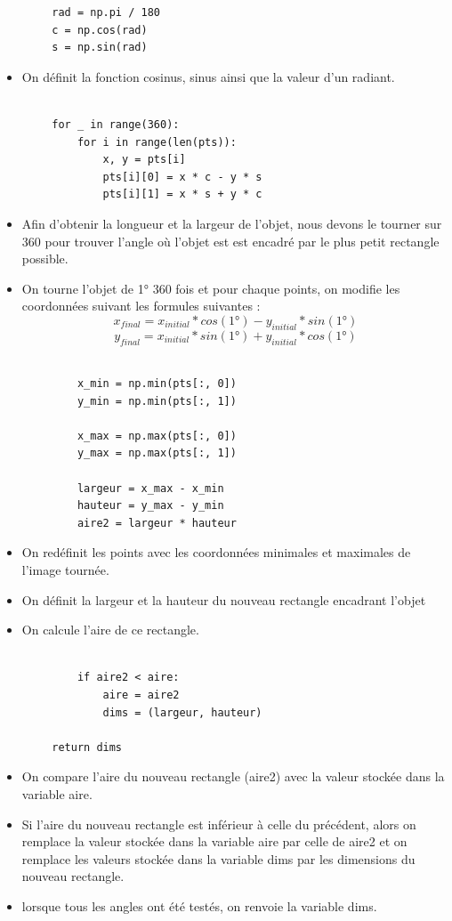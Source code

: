 \documentclass[titlepage]{article}
\begin{document}
	\begin{lstlisting}
		rad = np.pi / 180
		c = np.cos(rad)
		s = np.sin(rad)
	\end{lstlisting}
	\begin{itemize}
		\item On définit la fonction cosinus, sinus ainsi que la valeur d'un radiant.
	\end{itemize}
	\begin{lstlisting}
		
		for _ in range(360):
			for i in range(len(pts)):
				x, y = pts[i]
				pts[i][0] = x * c - y * s
				pts[i][1] = x * s + y * c
	\end{lstlisting}
	\begin{itemize}
		\item 
		Afin d'obtenir la longueur et la largeur de l'objet, nous devons le tourner sur 360 pour trouver l'angle où l'objet est est encadré par le plus petit rectangle possible.
		\item 
		On tourne l'objet de 1° 360 fois et pour chaque points, on modifie les coordonnées suivant les formules suivantes : $$x_{final} = x_{initial}*cos(1°)-y_{initial}*sin(1°)$$ $$y_{final} = x_{initial}*sin(1°)+y_{initial}*cos(1°)$$
	\end{itemize}
	\begin{lstlisting}	
		
			x_min = np.min(pts[:, 0])
			y_min = np.min(pts[:, 1])
			
			x_max = np.max(pts[:, 0])
			y_max = np.max(pts[:, 1])
	
			largeur = x_max - x_min
			hauteur = y_max - y_min
			aire2 = largeur * hauteur
	\end{lstlisting}
	\begin{itemize}
	\item 
	On redéfinit les points avec les coordonnées minimales et maximales de l'image tournée.
	\item 
	On définit la largeur et la hauteur du nouveau rectangle encadrant l'objet
	\item 
	On calcule l'aire de ce rectangle.
	
	\end{itemize}
	\begin{lstlisting}
	
			if aire2 < aire:
				aire = aire2
				dims = (largeur, hauteur)
	
		return dims
	\end{lstlisting}
	\begin{itemize}
		\item On compare l'aire du nouveau rectangle (aire2) avec la valeur stockée dans la variable aire.
		\item Si l'aire du nouveau rectangle est inférieur à celle du précédent, alors on remplace la valeur stockée dans la variable aire par celle de aire2 et on remplace les valeurs stockée dans la variable dims par les dimensions du nouveau rectangle.
		\item lorsque tous les angles ont été testés, on renvoie la variable dims.
	\end{itemize}
\end{document}

